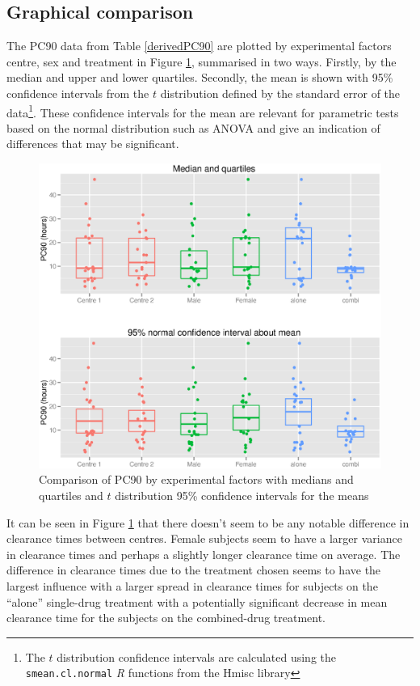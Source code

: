 \subsection{Graphical comparison}
The PC90 data from Table \ref{derivedPC90} are plotted by experimental factors centre, sex and treatment in Figure \ref{pc90boxes}, summarised in two ways. Firstly, by the median and upper and lower quartiles. Secondly, the mean is shown with 95\% confidence intervals from the $t$ distribution defined by the standard error of the data\footnote{The $t$ distribution confidence intervals are calculated using the \texttt{smean.cl.normal} \emph{R} functions from the Hmisc library\cite{Hmisc}}. These confidence intervals for the mean are relevant for parametric tests based on the normal distribution such as ANOVA and give an indication of differences that may be significant.
\begin{figure}[h]
\includegraphics[width=6.5in]{pc90boxes.eps} 
\caption{Comparison of PC90 by experimental factors with medians and quartiles and $t$ distribution 95\% confidence intervals for the means}
\label{pc90boxes}
\end{figure}

It can be seen in Figure \ref{pc90boxes} that there doesn't seem to be any notable difference in clearance times between centres. Female subjects seem to have a larger variance in clearance times and perhaps a slightly longer clearance time on average. The difference in clearance times due to the treatment chosen seems to have the largest influence with a larger spread in clearance times for subjects on the ``alone'' single-drug treatment with a potentially significant decrease in mean clearance time for the subjects on the combined-drug treatment.

